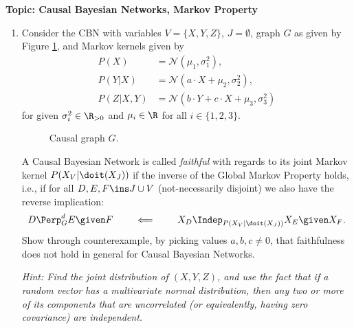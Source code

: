 

\flushleft\textbf{Topic: Causal Bayesian Networks, Markov Property}

\begin{enumerate}[label=6.\arabic*]
    \item %
    Consider the CBN with variables $V=\{X, Y, Z\}$, $J=\emptyset$, graph $G$ as given by Figure \ref{fig:one}, and Markov kernels given by
    \begin{align*}
        P(X)      & = \mathcal{N}(\mu_1, \sigma^2_1),                      \\
        P(Y|X)    & = \mathcal{N}(a\cdot X + \mu_2, \sigma^2_2),           \\
        P(Z|X, Y) & = \mathcal{N}(b\cdot Y + c\cdot X + \mu_3, \sigma^2_3)
    \end{align*}
    for given $\sigma_i^2\in\R_{>0}$ and $\mu_i\in\R$ for all $i\in\{1, 2, 3\}$.

    \begin{figure}[ht]
        \centering
        \caption{Causal graph $G$.}
        \label{fig:one}
    \end{figure}

    A Causal Bayesian Network is called \emph{faithful} with regards to its joint Markov kernel $P(X_V|\doit(X_J))$ if the inverse of the Global Markov Property holds, i.e., if for all $D, E, F \ins J \cup V$ (not-necessarily disjoint) we also have the reverse implication:
    \[ D \Perp^d_G E \given F \qquad \impliedby \qquad X_D \Indep_{P(X_V|\doit(X_J))} X_E \given X_F. \]
    Show through counterexample, by picking values $a, b, c \neq 0$, that faithfulness does not hold in general for Causal Bayesian Networks.

    \emph{Hint: Find the joint distribution of $(X, Y, Z)$, and use the fact that if a random vector has a multivariate normal distribution, then any two or more of its components that are uncorrelated (or equivalently, having zero covariance) are independent.}


\end{enumerate}
